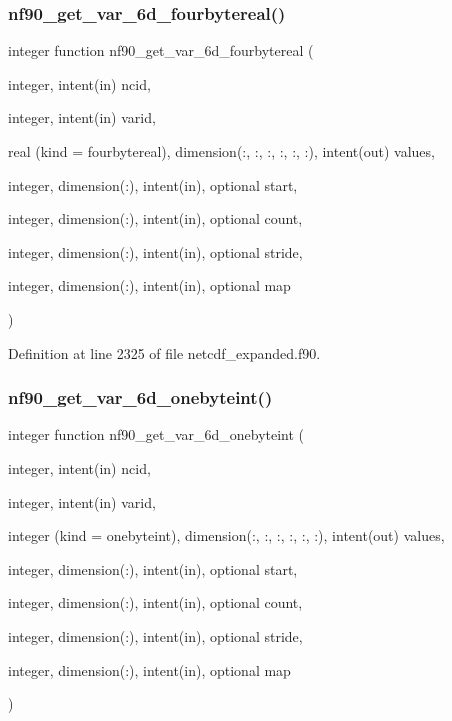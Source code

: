 \subsubsection{\texorpdfstring{nf90\+\_\+get\+\_\+var\+\_\+6d\+\_\+fourbytereal()}{nf90\_get\_var\_6d\_fourbytereal()}}
{\footnotesize\ttfamily integer function nf90\+\_\+get\+\_\+var\+\_\+6d\+\_\+fourbytereal (\begin{DoxyParamCaption}\item[{integer, intent(in)}]{ncid,  }\item[{integer, intent(in)}]{varid,  }\item[{real (kind = fourbytereal), dimension(\+:, \+:, \+:, \+:, \+:, \+:), intent(out)}]{values,  }\item[{integer, dimension(\+:), intent(in), optional}]{start,  }\item[{integer, dimension(\+:), intent(in), optional}]{count,  }\item[{integer, dimension(\+:), intent(in), optional}]{stride,  }\item[{integer, dimension(\+:), intent(in), optional}]{map }\end{DoxyParamCaption})}



Definition at line 2325 of file netcdf\+\_\+expanded.\+f90.

\mbox{\label{netcdf__expanded_8f90_a6fc87306b85b0d055780a2595c65f60d}} 
\subsubsection{\texorpdfstring{nf90\+\_\+get\+\_\+var\+\_\+6d\+\_\+onebyteint()}{nf90\_get\_var\_6d\_onebyteint()}}
{\footnotesize\ttfamily integer function nf90\+\_\+get\+\_\+var\+\_\+6d\+\_\+onebyteint (\begin{DoxyParamCaption}\item[{integer, intent(in)}]{ncid,  }\item[{integer, intent(in)}]{varid,  }\item[{integer (kind = onebyteint), dimension(\+:, \+:, \+:, \+:, \+:, \+:), intent(out)}]{values,  }\item[{integer, dimension(\+:), intent(in), optional}]{start,  }\item[{integer, dimension(\+:), intent(in), optional}]{count,  }\item[{integer, dimension(\+:), intent(in), optional}]{stride,  }\item[{integer, dimension(\+:), intent(in), optional}]{map }\end{DoxyParamCaption})}



